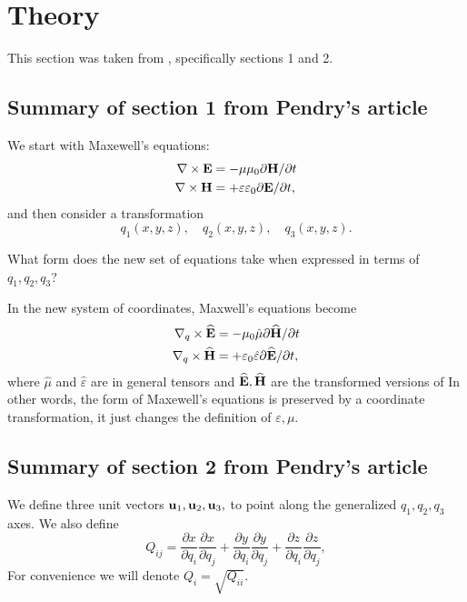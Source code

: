\documentclass{amsart}
\begin{document}

\section{Theory}
This section was taken from \cite{ward96}, specifically sections 1 and 2.
\subsection{Summary of section 1 from Pendry's article}
We start with Maxewell's equations:
\begin{align*}
  \nabla \times \textbf{E} &= -\mu \mu_0 \partial \textbf{H} /\partial t\\
  \nabla \times \textbf{H} &= +\varepsilon \varepsilon_0 \partial \textbf{E} /\partial t,
\end{align*}
and then consider a transformation
\[
q_1(x,y,z), \quad q_2(x,y,z), \quad q_3(x,y,z).
\]

 What form does the new set of equations take when
expressed in terms of $q_1,q_2,q_3$?

 In the new system of coordinates, Maxwell's equations become
\begin{align*}
  \nabla_q \times \widehat{\textbf{E}} &= -\mu_0\hat{\mu} \partial \widehat{\textbf{H}}/\partial t\\
  \nabla_q \times \widehat{\textbf{H}} &= +\varepsilon_0 \hat{\varepsilon} \partial \widehat{\textbf{E}}/\partial t,
\end{align*}
where $\hat{\mu}$ and $\hat{\varepsilon}$ are in general tensors and $\widehat{\textbf{E}},\widehat{\textbf{H}}$ are the transformed versions of 
In other words, the form of Maxewell's equations is preserved by a coordinate transformation, it just changes the definition of $\varepsilon,\mu$.
\subsection{Summary of section 2 from Pendry's article}
We define three unit vectors $\textbf{u}_1,\textbf{u}_2,\textbf{u}_3,$ to point along the generalized $q_1,q_2,q_3$ axes.
We also define
\begin{equation}\label{matrixQ}
  Q_{ij}=\frac{\partial x}{\partial q_i}\frac{\partial x}{\partial q_j}+\frac{\partial y}{\partial q_i}\frac{\partial y}{\partial q_j}+\frac{\partial z}{\partial q_i}\frac{\partial z}{\partial q_j},
\end{equation}
For convenience we will denote $Q_i=\sqrt{Q_{ii}}$.
\end{document}
